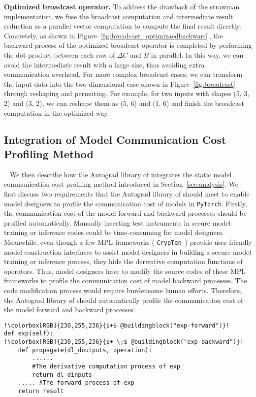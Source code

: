 \noindent\textbf{Optimized broadcast operator.} To address the drawback of the strawman implementation, we fuse the broadcast computation and intermediate result reduction as a parallel vector computation to compute the final result directly. Concretely, as shown in Figure~\ref{fig:broadcast_optimizaedbackward}, the backward process of the optimized broadcast operator is completed by performing the dot product between each row of $\Delta C$ and $B$ in parallel. In this way, we can avoid the intermediate result with a large size, thus avoiding extra communication overhead. For more complex broadcast cases, we can transform the input data into the two-dimensional case shown in Figure~\ref{fig:broadcast} through reshaping and permuting. For example, for two inputs with shapes (5, 3, 2) and (3, 2), we can reshape them as (5, 6) and (1, 6) and finish the broadcast computation in the optimized way.

\subsection{Integration of Model Communication Cost Profiling Method}~\label{subsec:autograd_profiling}
We then describe how the Autograd library of \hawkeye integrates the static model communication cost profiling method introduced in Section~\ref{sec:analysis}. We first discuss two requirements that the Autograd library of \hawkeye should meet to enable model designers to profile the communication cost of models in \texttt{PyTorch}. Firstly, the communication cost of the model forward and backward processes should be profiled automatically. Manually inserting test instruments in secure model training or inference codes could be time-consuming for model designers. Meanwhile, even though a few MPL frameworks ( \texttt{CrypTen}~\cite{crypten2020}) provide user-friendly model construction interfaces to assist model designers in building a secure model training or inference process, they hide the derivative computation functions of operators. Thus, model designers have to modify the source codes of these MPL frameworks to profile the communication cost of model backward processes. The code modification process would require burdensome human efforts. Therefore, the Autograd library of \hawkeye should automatically profile the communication cost of the model forward and backward processes.  

\begin{lstlisting}[escapechar=!,mathescape,xleftmargin=2em,framexleftmargin=2em, caption = {The labeled exp function in the Tensor module of the Autograd library of \hawkeye. The newly added labeling codes are highlighted on a green background and labeled with a plus sign at the beginning of the line.},columns=fullflexible, label = {list:autograd_labeling}]
!\colorbox[RGB]{230,255,236}{$+$ @buildingblock("exp-forward")}!
def exp(self):
!\colorbox[RGB]{230,255,236}{$+ \;$ @buildingblock("exp-backward")}!
    def propagate(dl_doutputs, operation):
        ...... 
        #The derivative computation process of exp
        return dl_dinputs
    ..... #The forward process of exp
    return result
\end{lstlisting}



